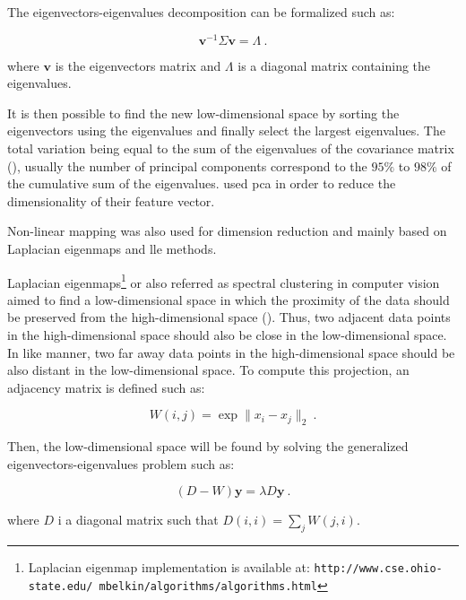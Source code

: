 The eigenvectors-eigenvalues decomposition can be formalized such as:

\begin{equation}
	\mathbf{v}^{-1} \Sigma \mathbf{v} = \Lambda \ .
	\label{eq:eigpca}
\end{equation}

\noindent where $\mathbf{v}$ is the eigenvectors matrix and $\Lambda$ is a diagonal matrix containing the eigenvalues. 

It is then possible to find the new low-dimensional space by sorting the eigenvectors using the eigenvalues and finally select the largest eigenvalues. The total variation being equal to the sum of the eigenvalues of the covariance matrix (\cite{Fodor2002}), usually the number of principal components correspond to the $95\%$ to $98\%$ of the cumulative sum of the eigenvalues. \cite{Tiwari2008,Tiwari2009,Tiwari2012} used \ac{pca} in order to reduce the dimensionality of their feature vector.

Non-linear mapping was also used for dimension reduction and mainly based on Laplacian eigenmaps and \acf{lle} methods.

Laplacian eigenmaps\footnote{Laplacian eigenmap implementation is available at: \texttt{http://www.cse.\allowbreak ohio-state.edu/~mbelkin/algorithms/algorithms.html}} or also referred as spectral clustering in computer vision aimed to find a low-dimensional space in which the proximity of the data should be preserved from the high-dimensional space (\cite{Shi2000,Belkin2001}). Thus, two adjacent data points in the high-dimensional space should also be close in the low-dimensional space. In like manner, two far away data points in the high-dimensional space should be also distant in the low-dimensional space. To compute this projection, an adjacency matrix is defined such as:

\begin{equation}
	W(i,j) = \exp \| x_i - x_j \|_2 \ .
	\label{eq:gew}
\end{equation}

Then, the low-dimensional space will be found by solving the generalized eigenvectors-eigenvalues problem such as:

\begin{equation}
	(D-W)\mathbf{y} = \lambda D \mathbf{y} \ .
	\label{eq:geeig}
\end{equation}

\noindent where $D$ i a diagonal matrix such that $D(i,i) = \sum_j W(j,i)$.

